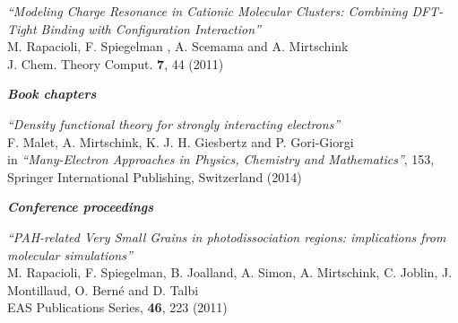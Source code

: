 \documentclass[line,margin]{res}
\begin{document}
\begin{resume}
\begin{etaremune}
				\item {\sl ``Modeling Charge Resonance in Cationic Molecular Clusters: Combining DFT-Tight Binding with Configuration Interaction''}\\
					M. Rapacioli, F. Spiegelman , A. Scemama and A. Mirtschink\\
					J. Chem. Theory Comput. \textbf{7}, 44 (2011)

               \end{etaremune}								

\textit{\textbf{Book chapters}}\smallskip

				\begin{etaremune}
				
				\item {\sl ``Density functional theory for strongly interacting electrons''}\\
				F. Malet, A. Mirtschink, K. J. H. Giesbertz and P. Gori-Giorgi\\
				in \textit{``Many-Electron Approaches in Physics, Chemistry and Mathematics''}, 153, Springer International Publishing, Switzerland (2014) 

               \end{etaremune}
               
               \textit{\textbf{Conference  proceedings}}\smallskip

				\begin{etaremune}
				
				\item  {\sl ``PAH-related Very Small Grains in photodissociation regions: implications from molecular simulations''}\\
					M. Rapacioli, F. Spiegelman, B. Joalland, A. Simon, A. Mirtschink, C. Joblin, J. Montillaud, O. Berné and D. Talbi\\ 
					 EAS Publications Series, \textbf{46}, 223 (2011)

               \end{etaremune}							
  
\end{resume}
\end{document}
